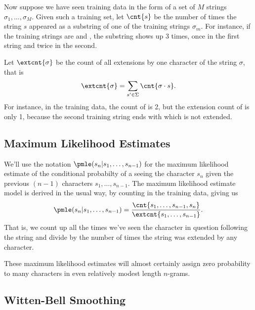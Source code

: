 Now suppose we have seen training data in the form of a set of $M$
strings $\sigma_1,\ldots,\sigma_M$.  Given such a training set, let
$\cnt{s}$ be the number of times the string $s$ appeared as a
substring of one of the training strings $\sigma_m$.  For instance, if
the training strings are  and
, the substring  shows up
3 times, once in the first string and twice in the second.

Let $\extcnt{\sigma}$ be the count of all extensions by one character
of the string $\sigma$, that is
%
\begin{equation}
\extcnt{\sigma} = \sum_{s' \in \Sigma} \cnt{\sigma \cdot s}.\label{eq:char-lm-extcnt}
\end{equation}
%
For instance, in the training data, the count of  is
2, but the extension count of  is only 1, because
the second training string ends with  which is not
extended.


\subsection{Maximum Likelihood Estimates}

We'll use the notation $\pmle(s_n|s_1,\ldots,s_{n-1})$ for
the maximum likelihood estimate of the conditional probabilty of a
seeing the character $s_n$ given the previous $(n-1)$ characters
$s_1,\ldots,s_{n-1}$.  The maximum likelihood estimate model is
derived in the usual way, by counting in the training data, giving us
%
\begin{equation}
\pmle(s_n|s_1,\ldots,s_{n-1})
= \frac{\cnt{s_1,\ldots,s_{n-1},s_{n}}}
       {\extcnt{s_1,\ldots,s_{n-1}}}.
\end{equation}
%
That is, we count up all the times we've seen the character in
question following the string and divide by the number of times
the string was extended by any character.

These maximum likelihood estimates will almost certainly assign zero
probability to many characters in even relatively modest length
$n$-grams. 

\subsection{Witten-Bell Smoothing}

